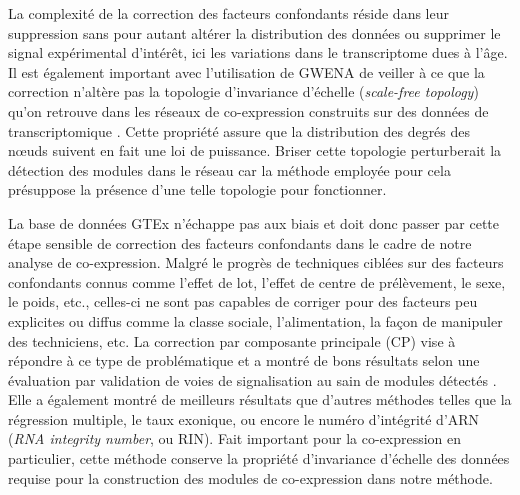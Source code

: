 La complexité de la correction des facteurs confondants réside dans leur suppression sans pour autant altérer la distribution des données ou supprimer le signal expérimental d'intérêt, ici les variations dans le transcriptome dues à l'âge. 
Il est également important avec l'utilisation de GWENA de veiller à ce que la correction n'altère pas la topologie d'invariance d'échelle (\textit{scale-free topology}) qu'on retrouve dans les réseaux de co-expression construits sur des données de transcriptomique . Cette propriété assure que la distribution des degrés des nœuds suivent en fait une loi de puissance. Briser cette topologie perturberait la détection des modules dans le réseau car la méthode employée pour cela présuppose la présence d'une telle topologie pour fonctionner.

La base de données GTEx n'échappe pas aux biais  et doit donc passer par cette étape sensible de correction des facteurs confondants dans le cadre de notre analyse de co-expression.
Malgré le progrès de techniques ciblées sur des facteurs confondants connus comme l'effet de lot, l'effet de centre de prélèvement, le sexe, le poids, etc., celles-ci ne sont pas capables de corriger pour des facteurs peu explicites ou diffus comme la classe sociale, l'alimentation, la façon de manipuler des techniciens, etc. La correction par composante principale (CP) vise à répondre à ce type de problématique et a montré de bons résultats selon une évaluation par validation de voies de signalisation au sain de modules détectés . Elle a également montré de meilleurs résultats que d'autres méthodes telles que la régression multiple, le taux exonique, ou encore le numéro d'intégrité d'ARN (\textit{RNA integrity number}, ou RIN). Fait important pour la co-expression en particulier, cette méthode conserve la propriété d'invariance d'échelle des données requise pour la construction des modules de co-expression dans notre méthode.


